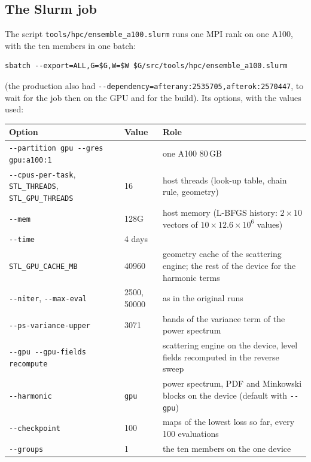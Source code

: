 \documentclass{aa}
\begin{document}
\subsection{The Slurm job}

The script \texttt{tools/hpc/ensemble\_a100.slurm} runs one MPI rank on one A100, with the ten members in one batch:
\begin{lstlisting}
sbatch --export=ALL,G=$G,W=$W $G/src/tools/hpc/ensemble_a100.slurm
\end{lstlisting}
(the production also had \texttt{-{}-dependency=afterany:2535705,afterok:2570447}, to wait for the job then on the GPU and for the build). Its options, with the values used:

\begin{center}\small
\begin{tabular}{@{}llp{8cm}@{}}
\hline\hline
Option & Value & Role \\
\hline
\texttt{-{}-partition gpu -{}-gres gpu:a100:1} & & one A100 80\,GB \\
\texttt{-{}-cpus-per-task}, \texttt{STL\_THREADS}, \texttt{STL\_GPU\_THREADS} & 16 & host threads (look-up table, chain rule, geometry) \\
\texttt{-{}-mem} & 128G & host memory (L-BFGS history: $2\times10$ vectors of $10\times12.6\times10^6$ values) \\
\texttt{-{}-time} & 4 days & \\
\texttt{STL\_GPU\_CACHE\_MB} & 40960 & geometry cache of the scattering engine; the rest of the device for the harmonic terms \\
\texttt{-{}-niter}, \texttt{-{}-max-eval} & 2500, 50000 & as in the original runs \\
\texttt{-{}-ps-variance-upper} & 3071 & bands of the variance term of the power spectrum \\
\texttt{-{}-gpu -{}-gpu-fields recompute} & & scattering engine on the device, level fields recomputed in the reverse sweep \\
\texttt{-{}-harmonic} & \texttt{gpu} & power spectrum, PDF and Minkowski blocks on the device (default with \texttt{-{}-gpu}) \\
\texttt{-{}-checkpoint} & 100 & maps of the lowest loss so far, every 100 evaluations \\
\texttt{-{}-groups} & 1 & the ten members on the one device \\
\hline
\end{tabular}
\end{center}
\end{document}
